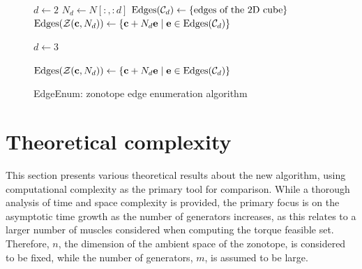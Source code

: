 \begin{figure}[!ht]
  \centering
  \begin{minipage}{1.0\linewidth}
    \begin{algorithm}[H]
      \SetAlgoLined
      $d\gets 2$\;
      $N_d\gets N[:,:d]$\;      
      $\text{Edges}(\mathcal{C}_d)\gets \{\text{edges of the 2D cube}\}$ 
      $\text{Edges}(\mathcal{Z}(\mathbf{c}, N_d))\gets \{\mathbf{c} + N_d\mathbf{e} \mid \mathbf{e}\in\text{Edges}(\mathcal{C}_d)\}$ \;
      
      $d\gets 3$\;
      
      $\text{Edges}(\mathcal{Z}(\mathbf{c}, N_d))\gets \{\mathbf{c} + N_d\mathbf{e} \mid \mathbf{e}\in\text{Edges}(\mathcal{C}_d)\}$ \;
      \caption{EdgeEnum: zonotope edge enumeration algorithm}
      \label{alg:edge_enum}
    \end{algorithm}

  \end{minipage}
\end{figure}

\section{Theoretical complexity}
\label{time_complexity_edgeenum}
This section presents various theoretical results about the new algorithm, using computational complexity as the primary tool for comparison. While a thorough analysis of time and space complexity is provided, the primary focus is on the asymptotic time growth as the number of generators increases, as this relates to a larger number of muscles considered when computing the torque feasible set. Therefore, $n$, the dimension of the ambient space of the zonotope, is considered to be fixed, while the number of generators, $m$, is assumed to be large.

